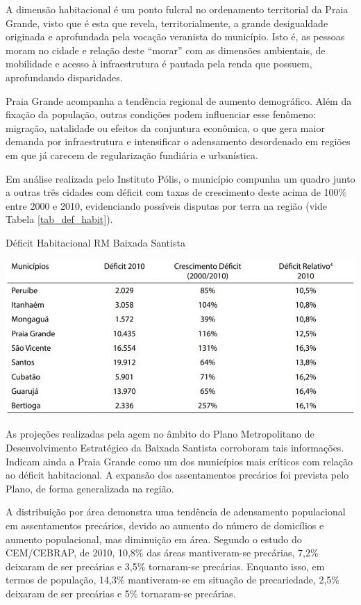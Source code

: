 	A dimensão habitacional é um ponto fulcral no ordenamento territorial da Praia Grande, visto que é esta que revela, territorialmente, a grande desigualdade originada e aprofundada pela vocação veranista do município. Isto é, as pessoas moram no cidade e relação deste ``morar'' com as dimensões ambientais, de mobilidade e acesso à infraestrutura é pautada pela renda que possuem, aprofundando disparidades.
	
	Praia Grande acompanha a tendência regional de aumento demográfico. Além da fixação da população, outras condições podem influenciar esse fenômeno: migração, natalidade ou efeitos da conjuntura econômica, o que gera maior demanda por infraestrutura e intensificar o adensamento desordenado em regiões em que já carecem de regularização fundiária e urbanística.
	
	Em análise realizada pelo Instituto Pólis, o município compunha um quadro junto a outras três cidades com déficit com taxas de crescimento deste acima de 100\% entre 2000 e 2010, evidenciando possíveis disputas por terra na região (vide Tabela \ref{tab_def_habit}).
	
	\begin{table}[h]
		\centering
		\caption{Déficit Habitacional RM Baixada Santista}
		\includegraphics[width=1\textwidth]{img/tab_def_habit.png}
		\label{tab_def_habit}
	\end{table}
	
	As projeções realizadas pela \gls{agem} no âmbito do Plano Metropolitano de Desenvolvimento Estratégico da Baixada Santista corroboram tais informações. Indicam ainda a Praia Grande como um dos municípios mais críticos com relação ao déficit habitacional. A expansão dos assentamentos precários foi prevista pelo Plano, de forma generalizada na região. 
	
	A distribuição por área demonstra uma tendência de adensamento populacional em assentamentos precários, devido ao aumento do número de domicílios e aumento populacional, mas diminuição em área. Segundo o estudo do CEM/CEBRAP,  de 2010, 10,8\% das áreas mantiveram-se precárias, 7,2\% deixaram de ser precárias e 3,5\% tornaram-se precárias. Enquanto isso, em termos de população, 14,3\% mantiveram-se em situação de precariedade, 2,5\% deixaram de ser precárias e 5\% tornaram-se precárias.
	
